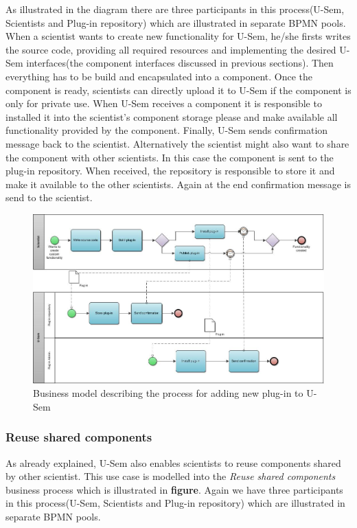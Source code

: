 As illustrated in the diagram there are three participants in this process(U-Sem, Scientists and Plug-in repository) which are illustrated in separate BPMN pools. When a scientist wants to create new functionality for U-Sem, he/she firsts writes the source code, providing all required resources and implementing the desired U-Sem interfaces(the component interfaces discussed in previous sections). Then everything has to be build and encapsulated into a component. Once the component is ready, scientists can directly upload it to U-Sem if the component is only for private use. When U-Sem receives a component it is responsible to installed it into the scientist's component storage please and make available all functionality provided by the component. Finally, U-Sem sends confirmation message back to the scientist. Alternatively the scientist might also want to share the component with other scientists. In this case the component is sent to the plug-in repository. When received, the repository is responsible to store it and make it available to the other scientists. Again at the end confirmation message is send to the scientist.

\begin{figure}[h!]
  \centering
  	\includegraphics[scale=0.7,angle=90]{plug-in/business_processes/CreatePlugInBusinessModel.jpg}
  \caption{Business model describing the process for adding new plug-in to U-Sem}
\end{figure}

\subsubsection{Reuse shared components}

As already explained, U-Sem also enables scientists to reuse components shared by other scientist. This use case is modelled into the \textit{Reuse shared components} business process which is illustrated in \textbf{figure}. Again we have three participants in this process(U-Sem, Scientists and Plug-in repository) which are illustrated in separate BPMN pools. 

